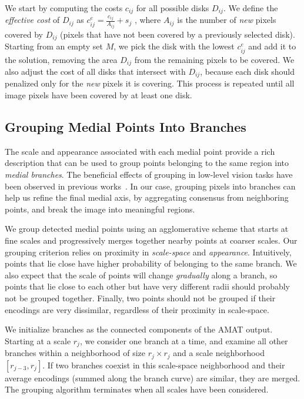 \documentclass[10pt,twocolumn,letterpaper]{article}
\begin{document}
We start by computing the costs $c_{ij}$ for all possible disks $D_{ij}$.
We define the \emph{effective cost} of $D_{ij}$ as $c_{ij}^e = \frac{c_{ij}}{A_{ij}} + s_j$ , where $A_{ij}$ is the number
of \emph{new} pixels covered by $D_{ij}$ (pixels that have not been covered by a previously selected disk).
Starting from an empty set $M$, we pick the disk with the lowest $c_{ij}^e$ and add it to the solution, 
removing the area $D_{ij}$ from the remaining pixels to be covered.
We also adjust the cost of all disks that intersect with $D_{ij}$, 
because each disk should penalized only for the \emph{new} pixels it is covering.
This process is repeated until all image pixels have been covered by at least one disk.

\subsection{Grouping Medial Points Into Branches}\label{sec:method:grouping}
The scale and appearance associated with each medial point provide a rich
description that can be used to group points belonging to the same region into \emph{medial branches}.
The beneficial effects of grouping in low-level vision tasks have been
observed in previous works~\cite{felzenszwalb2006min,zhu2007untangling,kokkinos2010highly,qi2015making}.
In our case, grouping pixels into branches can help us refine the final medial axis, 
by aggregating consensus from neighboring points, and break the image into meaningful regions.

We group detected medial points using an agglomerative scheme that starts at fine scales and
progressively merges together nearby points at coarser scales.
Our grouping criterion relies on proximity in \emph{scale-space} and \emph{appearance}.
Intuitively, points that lie close have higher probability of belonging to the same branch.
We also expect that the scale of points will change \emph{gradually} along a branch,
so points that lie close to each other but have very different radii should probably not be grouped together.
Finally, two points should not be grouped if their encodings are very dissimilar,
regardless of their proximity in scale-space. 

We initialize branches as the connected components of the AMAT output.
Starting at a scale $r_j$, we consider one branch at a time, and examine all other
branches within a neighborhood of size $r_j \times r_j$ and a scale neighborhood $[r_{j-3},r_j]$.
If two branches coexist in this scale-space neighborhood and their average encodings 
(summed along the branch curve) are similar, they are merged.
The grouping algorithm terminates when all scales have been considered.
\end{document}
